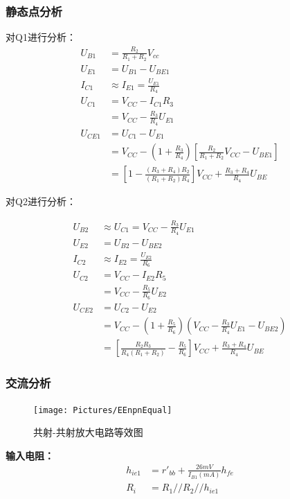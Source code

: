 \documentclass[11pt,a4paper,UTF8]{ctexart}
\begin{document}
			\subsubsection{静态点分析}
			对Q1进行分析：
			\begin{align}
				U_{B1} &= \frac{R_2}{R_1+R_2}V_{cc} \\	
				U_{E1} &= U_{B1} - U_{BE1} \\
				I_{C1} &\approx I_{E1} = \frac{U_{E1}}{R_4} \\
				U_{C1} &= V_{CC} - I_{C1}R_3 \nonumber\\ 
				&= V_{CC} - \frac{R_3}{R_4}U_{E1} \\
				U_{CE1} &= U_{C1} - U_{E1} \nonumber\\
				&= V_{CC} - (1+\frac{R_3}{R_4})[\frac{R_2}{R_1+R_2}V_{CC}-U_{BE1}] \nonumber\\
				&= [1-\frac{(R_3+R_4)R_2}{(R_1+R_2)R_4}]V_{CC} + \frac{R_3+R_4}{R_4}U_{BE}
			\end{align}
			
			对Q2进行分析：
				
			\begin{align}
				U_{B2} &\approx U_{C1} = V_{CC} - \frac{R_3}{R_4}U_{E1} \\
				U_{E2} &= U_{B2} - U_{BE2} \\
				I_{C2} &\approx I_{E2} = \frac{U_{E2}}{R_6} \\
				U_{C2} &= V_{CC} - I_{E2}R_5{}\nonumber \\
				&= V_{CC} - \frac{R_5}{R_6}U_{E2} \\
				U_{CE2} &= U_{C2} - U_{E2} \nonumber\\
				&= V_{CC} - (1+\frac{R_5}{R_6})(V_{CC} - \frac{R_3}{R_4}U_{E1}-U_{BE2}) \nonumber\\
				&= [\frac{R_2R_3}{R_4(R_1+R_2)}-\frac{R_5}{R_6}]V_{CC} + \frac{R_3+R_4}{R_4}U_{BE}
			\end{align}
			\subsubsection{交流分析}
			\begin{figure}[H]
				\centering
				\texttt{[image: Pictures/EEnpnEqual]}
				\caption{共射-共射放大电路等效图}
				\label{fig:eenpnequal}
			\end{figure}
			
			\textbf{输入电阻：}
			\begin{align}
				h_{ie1} &= r'_{bb} + \frac{26mV}{I_{B1}(mA)}h_{fe} \\
				R_i &= R_1 // R_2 // h_{ie1} \label{equ:EERi}
			\end{align}
			
\end{document}
